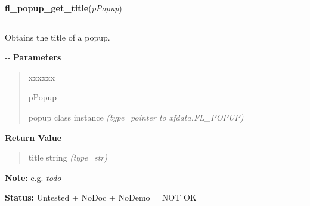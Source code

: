 \hspace{.8\funcindent}\begin{boxedminipage}{\funcwidth}

    \raggedright \textbf{fl\_popup\_get\_title}(\textit{pPopup})

    \vspace{-1.5ex}

    \rule{\textwidth}{0.5\fboxrule}
\setlength{\parskip}{2ex}

Obtains the title of a popup.

-{}-
\setlength{\parskip}{1ex}
      \textbf{Parameters}
      \vspace{-1ex}

      \begin{quote}
        \begin{Ventry}{xxxxxx}

          \item[pPopup]


popup class instance
            {\it (type=pointer to xfdata.FL\_POPUP)}

        \end{Ventry}

      \end{quote}

      \textbf{Return Value}
    \vspace{-1ex}

      \begin{quote}

title string
      {\it (type=str)}

      \end{quote}

\textbf{Note:} 
e.g. \emph{todo}


\textbf{Status:} 
Untested + NoDoc + NoDemo = NOT OK


    \end{boxedminipage}

    \label{xformslib:flpopup:fl_popup_set_title}

    \vspace{0.5ex}

